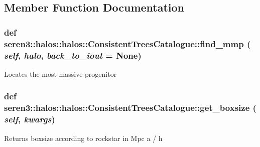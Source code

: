 \subsection{Member Function Documentation}
\hypertarget{classseren3_1_1halos_1_1halos_1_1ConsistentTreesCatalogue_a7120b78f9a4469c4fee989733c1f0553}{
\subsubsection[{find\_\-mmp}]{\setlength{\rightskip}{0pt plus 5cm}def seren3::halos::halos::ConsistentTreesCatalogue::find\_\-mmp ( {\em self}, \/   {\em halo}, \/   {\em back\_\-to\_\-iout} = {\ttfamily None})}}
\label{classseren3_1_1halos_1_1halos_1_1ConsistentTreesCatalogue_a7120b78f9a4469c4fee989733c1f0553}
\begin{DoxyVerb}
Locates the most massive progenitor
\end{DoxyVerb}
 \hypertarget{classseren3_1_1halos_1_1halos_1_1ConsistentTreesCatalogue_a441bf99e14ee24b299b85045bd68878d}{
\subsubsection[{get\_\-boxsize}]{\setlength{\rightskip}{0pt plus 5cm}def seren3::halos::halos::ConsistentTreesCatalogue::get\_\-boxsize ( {\em self}, \/   {\em kwargs})}}
\label{classseren3_1_1halos_1_1halos_1_1ConsistentTreesCatalogue_a441bf99e14ee24b299b85045bd68878d}
\begin{DoxyVerb}
Returns boxsize according to rockstar in Mpc a / h
\end{DoxyVerb}
 

